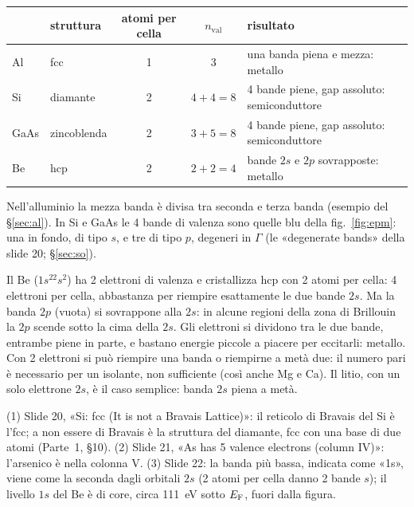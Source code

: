 \documentclass[11pt,a4paper]{article}
\begin{document}
\begin{center}\small
\begin{tabular}{@{}llccl@{}}
\toprule
& struttura & atomi per cella & $n_{\mathrm{val}}$ & risultato\\
\midrule
Al & fcc & 1 & 3 & una banda piena e mezza: metallo\\
Si & diamante & 2 & $4+4=8$ & 4 bande piene, gap assoluto: semiconduttore\\
GaAs & zincoblenda & 2 & $3+5=8$ & 4 bande piene, gap assoluto: semiconduttore\\
Be & hcp & 2 & $2+2=4$ & bande $2s$ e $2p$ sovrapposte: metallo\\
\bottomrule
\end{tabular}
\end{center}
Nell'alluminio la mezza banda è divisa tra seconda e terza banda (esempio del §\ref{sec:al}). In Si e GaAs le 4 bande di valenza sono quelle blu
della fig.~\ref{fig:epm}: una in fondo, di tipo $s$, e tre di tipo $p$, degeneri in $\Gamma$ (le «degenerate bands» della slide 20; §\ref{sec:so}).

Il Be ($1s^22s^2$) ha 2 elettroni di valenza e cristallizza hcp con 2 atomi per cella: 4 elettroni per cella, abbastanza per riempire esattamente le
due bande $2s$. Ma la banda $2p$ (vuota) si sovrappone alla $2s$: in alcune regioni della zona di Brillouin la $2p$ scende sotto la cima della $2s$. Gli
elettroni si dividono tra le due bande, entrambe piene in parte, e bastano energie piccole a piacere per eccitarli: metallo. Con 2 elettroni si può
riempire una banda o riempirne a metà due: il numero pari è necessario per un isolante, non sufficiente (così anche Mg e Ca). Il litio, con un solo
elettrone $2s$, è il caso semplice: banda $2s$ piena a metà.

\begin{osservazione}[slide 20--22]
(1) Slide 20, «Si: fcc (It is not a Bravais Lattice)»: il reticolo di Bravais del Si è l'fcc; a non essere di Bravais è la struttura del diamante,
fcc con una base di due atomi (Parte~1, §10). (2) Slide 21, «As has 5 valence electrons (column IV)»: l'arsenico è nella colonna V. (3) Slide 22:
la banda più bassa, indicata come «1s», viene come la seconda dagli orbitali $2s$ (2 atomi per cella danno 2 bande $s$); il livello $1s$ del Be è di
core, circa \SI{111}{eV} sotto $E_{\mathrm F}$, fuori dalla figura.
\end{osservazione}
\end{document}
